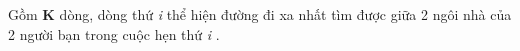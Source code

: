 Gồm \textbf{ K } dòng, dòng thứ \emph{ i } thể hiện đường đi xa nhất tìm được giữa 2 ngôi nhà của 2 người bạn trong cuộc hẹn thứ \emph{ i } .

\